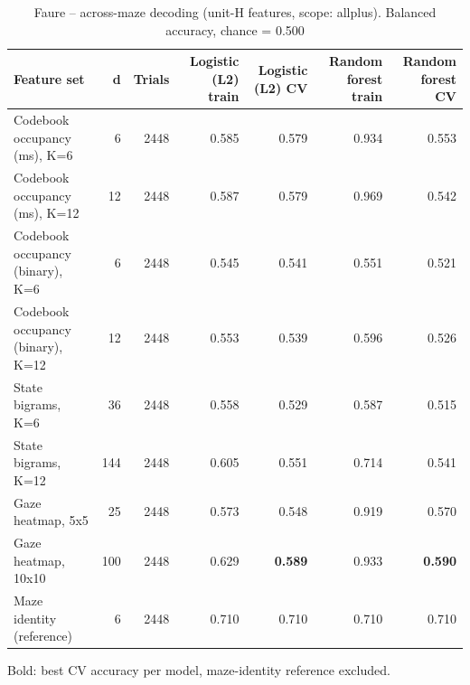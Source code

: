 \begin{table}[t]
\centering
\caption{Faure -- across-maze decoding (unit-H features, scope: allplus). Balanced accuracy, chance = 0.500}
\label{tab:crossmaze_Faure}
\begin{tabular}{lrrrrrr}
\toprule
Feature set & d & Trials & Logistic (L2) train & Logistic (L2) CV & Random forest train & Random forest CV \\
\midrule
Codebook occupancy (ms), K=6 & 6 & 2448 & 0.585 & 0.579 & 0.934 & 0.553 \\
Codebook occupancy (ms), K=12 & 12 & 2448 & 0.587 & 0.579 & 0.969 & 0.542 \\
Codebook occupancy (binary), K=6 & 6 & 2448 & 0.545 & 0.541 & 0.551 & 0.521 \\
Codebook occupancy (binary), K=12 & 12 & 2448 & 0.553 & 0.539 & 0.596 & 0.526 \\
State bigrams, K=6 & 36 & 2448 & 0.558 & 0.529 & 0.587 & 0.515 \\
State bigrams, K=12 & 144 & 2448 & 0.605 & 0.551 & 0.714 & 0.541 \\
Gaze heatmap, 5x5 & 25 & 2448 & 0.573 & 0.548 & 0.919 & 0.570 \\
Gaze heatmap, 10x10 & 100 & 2448 & 0.629 & \textbf{0.589} & 0.933 & \textbf{0.590} \\
Maze identity (reference) & 6 & 2448 & 0.710 & 0.710 & 0.710 & 0.710 \\
\bottomrule
\end{tabular}
\par\smallskip
{\footnotesize Bold: best CV accuracy per model, maze-identity reference excluded.}
\end{table}
